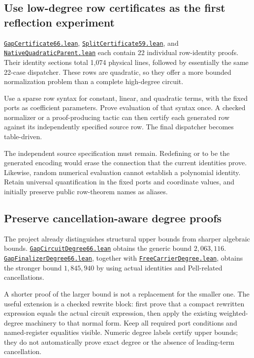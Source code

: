 \documentclass[11pt,letterpaper]{article}
\newcommand{\code}[1]{\texttt{\detokenize{#1}}}
\newcommand{\SourceBase}{https://github.com/VladimirReshetnikov/ProveIt/blob/60e9c5d620c6c387d932876cfa2d9376f64ea56c/Computability/DiophantineConsistency}
\newcommand{\module}[1]{\href{\SourceBase/Lean/DiophantineConsistency/#1.lean}{\texttt{#1.lean}}}
\begin{document}
\subsection{Use low-degree row certificates as the first reflection experiment}

\module{GapCertificate66}, \module{SplitCertificate59}, and \module{NativeQuadraticParent} each contain 22 individual row-identity proofs. Their identity sections total 1,074 physical lines, followed by essentially the same 22-case dispatcher. These rows are quadratic, so they offer a more bounded normalization problem than a complete high-degree circuit.

Use a sparse row syntax for constant, linear, and quadratic terms, with the fixed ports as coefficient parameters. Prove evaluation of that syntax once. A checked normalizer or a proof-producing tactic can then certify each generated row against its independently specified source row. The final dispatcher becomes table-driven.

The independent source specification must remain. Redefining \code{deliveredRows} or \code{shiftedRows} to be the generated encoding would erase the connection that the current identities prove. Likewise, random numerical evaluation cannot establish a polynomial identity. Retain universal quantification in the fixed ports and coordinate values, and initially preserve public row-theorem names as aliases.

\subsection{Preserve cancellation-aware degree proofs}

The project already distinguishes structural upper bounds from sharper algebraic bounds. \module{GapCircuitDegree66} obtains the generic bound $2{,}063{,}116$. \module{GapFinalizerDegree66}, together with \module{FreeCarrierDegree}, obtains the stronger bound $1{,}845{,}940$ by using actual identities and Pell-related cancellations.

A shorter proof of the larger bound is not a replacement for the smaller one. The useful extension is a checked rewrite block: first prove that a compact rewritten expression equals the actual circuit expression, then apply the existing weighted-degree machinery to that normal form. Keep all required port conditions and named-register equalities visible. Numeric degree labels certify upper bounds; they do not automatically prove exact degree or the absence of leading-term cancellation.
\end{document}
